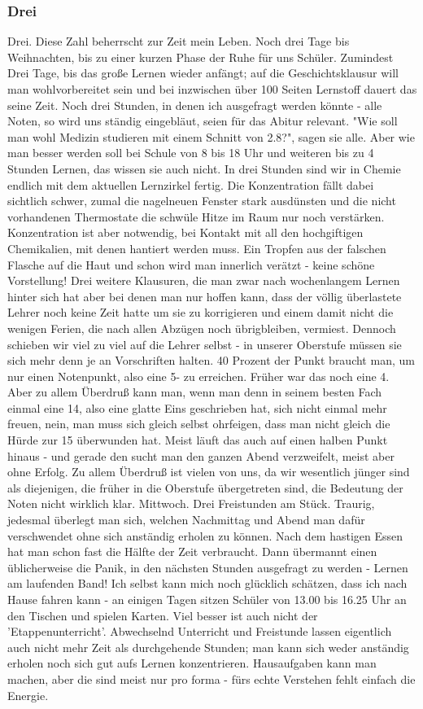 \documentclass[a4paper,12pt,oneside]{scrbook}
\begin{document}
\subsubsection{Drei}
Drei.
Diese Zahl beherrscht zur Zeit mein Leben.
Noch drei Tage bis Weihnachten, bis zu einer kurzen Phase der Ruhe für uns Schüler. Zumindest Drei Tage, bis das große Lernen wieder anfängt; auf die Geschichtsklausur will man wohlvorbereitet sein und bei inzwischen über 100 Seiten Lernstoff dauert das seine Zeit.
Noch drei Stunden, in denen ich ausgefragt werden könnte - alle Noten, so wird uns ständig eingebläut, seien für das Abitur relevant. "Wie soll man wohl Medizin studieren mit einem Schnitt von 2.8?", sagen sie alle. Aber wie man besser werden soll bei Schule von 8 bis 18 Uhr und weiteren bis zu 4 Stunden Lernen, das wissen sie auch nicht.
In drei Stunden sind wir in Chemie endlich mit dem aktuellen Lernzirkel fertig. Die Konzentration fällt dabei sichtlich schwer, zumal die nagelneuen Fenster stark ausdünsten und die nicht vorhandenen Thermostate die schwüle Hitze im Raum nur noch verstärken. Konzentration ist aber notwendig, bei Kontakt mit all den hochgiftigen Chemikalien, mit denen hantiert werden muss. Ein Tropfen aus der falschen Flasche auf die Haut und schon wird man innerlich verätzt - keine schöne Vorstellung!
Drei weitere Klausuren, die man zwar nach wochenlangem Lernen hinter sich hat aber bei denen man nur hoffen kann, dass der völlig überlastete Lehrer noch keine Zeit hatte um sie zu korrigieren und einem damit nicht die wenigen Ferien, die nach allen Abzügen noch übrigbleiben, vermiest.
Dennoch schieben wir viel zu viel auf die Lehrer selbst - in unserer Oberstufe müssen sie sich mehr denn je an Vorschriften halten. 40 Prozent der Punkt braucht man, um nur einen Notenpunkt, also eine 5- zu erreichen. Früher war das noch eine 4. Aber zu allem Überdruß kann man, wenn man denn in seinem besten Fach einmal eine 14, also eine glatte Eins geschrieben hat, sich nicht einmal mehr freuen, nein, man muss sich gleich selbst ohrfeigen, dass man nicht gleich die Hürde zur 15 überwunden hat. Meist läuft das auch auf einen halben Punkt hinaus - und gerade den sucht man den ganzen Abend verzweifelt, meist aber ohne Erfolg. Zu allem Überdruß ist vielen von uns, da wir wesentlich jünger sind als diejenigen, die früher in die Oberstufe übergetreten sind, die Bedeutung der Noten nicht wirklich klar.
Mittwoch. Drei Freistunden am Stück. Traurig, jedesmal überlegt man sich, welchen Nachmittag und Abend man dafür verschwendet ohne sich anständig erholen zu können. Nach dem hastigen Essen hat man schon fast die Hälfte der Zeit verbraucht. Dann übermannt einen üblicherweise die Panik, in den nächsten Stunden ausgefragt zu werden - Lernen am laufenden Band! Ich selbst kann mich noch glücklich schätzen, dass ich nach Hause fahren kann - an einigen Tagen sitzen Schüler von 13.00 bis 16.25 Uhr an den Tischen und spielen Karten. Viel besser ist auch nicht der 'Etappenunterricht'. Abwechselnd Unterricht und Freistunde lassen eigentlich auch nicht mehr Zeit als durchgehende Stunden; man kann sich weder anständig erholen noch sich gut aufs Lernen konzentrieren. Hausaufgaben kann man machen, aber die sind meist nur pro forma - fürs echte Verstehen fehlt einfach die Energie.
\end{document}
